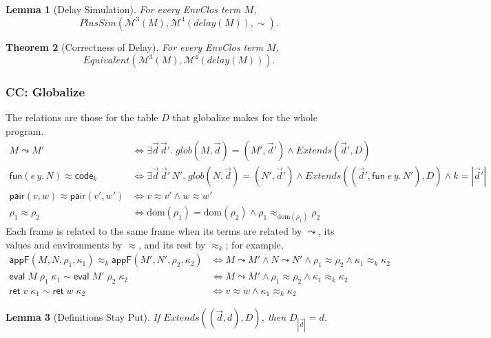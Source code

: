 \documentclass[10pt]{article}
\theoremstyle{acmplain}
\newtheorem{theorem}{Theorem}[section]
\newtheorem{lemma}[theorem]{Lemma}
\newcommand{\key}[1]{\mathsf{#1}}
\newcommand{\pass}[1]{\mathit{#1}}
\newcommand{\ev}[3]{\key{eval}\;#1\;#2\;#3}
\newcommand{\rt}[2]{\key{ret}\;#1\;#2}
\newcommand{\Mach}[1]{\mathcal{M}^{#1}}
\newcommand{\Equiv}{\mathit{Equivalent}}
\newcommand{\pairV}[2]{\key{pair}(#1, #2)}
\newcommand{\funV}[1]{\key{fun}(#1)}
\newcommand{\codeV}[1]{\key{code}_{#1}}
\newcommand{\Kf}[2]{\key{#1}(#2)}
\newcommand{\approxk}{\approx_k}
\begin{document}
\begin{lemma}[Delay Simulation]\label{lem:delay-fsim}
For every EnvClos term $M$,
\[
  \mathit{PlusSim}(\Mach{3}(M), \Mach{4}(\pass{delay}(M)), \sim) .
\]
\end{lemma}

\begin{theorem}[Correctness of Delay]\label{thm:delay-correct}
For every EnvClos term $M$,
\[
  \Equiv(\Mach{3}(M), \Mach{4}(\pass{delay}(M))) .
\]
\end{theorem}

\subsubsection{CC: Globalize}\label{sec:sim-globalize}

The relations are those for the table $D$ that globalize makes for the whole program.
\begin{align*}
  M \leadsto M' &\iff \exists \vec{d}\, \vec{d}'.\;
    \pass{glob}(M, \vec{d}) = (M', \vec{d}') \land \mathit{Extends}(\vec{d}', D) \\[1ex]
  \funV{e\, y.\, N} \approx \codeV{k} &\iff \exists \vec{d}\, \vec{d}'\, N'.\;
    \pass{glob}(N, \vec{d}) = (N', \vec{d}') \land
    \mathit{Extends}((\vec{d}', \key{fun}\; e\,y.\,N'), D) \land k = |\vec{d}'| \\
  \pairV{v}{w} \approx \pairV{v'}{w'} &\iff v \approx v' \land w \approx w' \\
  \rho_1 \approx \rho_2 &\iff \mathrm{dom}(\rho_1) = \mathrm{dom}(\rho_2) \land
    \rho_1 \approx_{\mathrm{dom}(\rho_1)} \rho_2
\end{align*}
Each frame is related to the same frame when its terms are related by
$\leadsto$, its values and environments by $\approx$, and its rest by $\approxk$;
for example,
\begin{align*}
  \Kf{appF}{M, N, \rho_1, \kappa_1} \approxk \Kf{appF}{M', N', \rho_2, \kappa_2}
    &\iff M \leadsto M' \land N \leadsto N' \land \rho_1 \approx \rho_2 \land \kappa_1 \approxk \kappa_2 \\[1ex]
  \ev{M}{\rho_1}{\kappa_1} \sim \ev{M'}{\rho_2}{\kappa_2}
    &\iff M \leadsto M' \land \rho_1 \approx \rho_2 \land \kappa_1 \approxk \kappa_2 \\
  \rt{v}{\kappa_1} \sim \rt{w}{\kappa_2} &\iff v \approx w \land \kappa_1 \approxk \kappa_2
\end{align*}

\begin{lemma}[Definitions Stay Put]\label{lem:global-extends}
If $\mathit{Extends}((\vec{d}, d), D)$, then $D_{|\vec{d}|} = d$.
\end{lemma}
\end{document}

